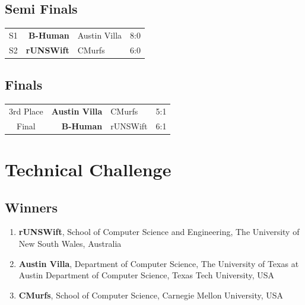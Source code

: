 \documentclass[pdftex,11pt,a4paper]{report}
\begin{document}
\subsection*{Semi Finals}

\begin{center}
   \begin{tabular}{crlc}
      S1 &\textbf{B-Human} & Austin Villa  &8:0 \\
      S2 &\textbf{rUNSWift} &CMurfs  &6:0
   \end{tabular}
\end{center}

\subsection*{Finals}

\begin{center}
   \begin{tabular}{crlc}
      3rd Place &\textbf{Austin Villa} & CMurfs  & 5:1  \\
      Final &\textbf{B-Human} &rUNSWift  &6:1 
   \end{tabular}
\end{center}
 
\section{Technical Challenge\label{challengeResults}}

\subsection*{Winners}
\begin{enumerate}
   \item \textbf{rUNSWift}, School of Computer Science and Engineering, The
      University of New South Wales, Australia 
   \item \textbf{Austin Villa},  Department of Computer Science, The
      University of Texas at Austin Department of Computer Science, Texas
      Tech University, USA
   \item \textbf{CMurfs}, School of Computer Science, Carnegie Mellon
      University, USA 
\end{enumerate}
 
\end{document}
